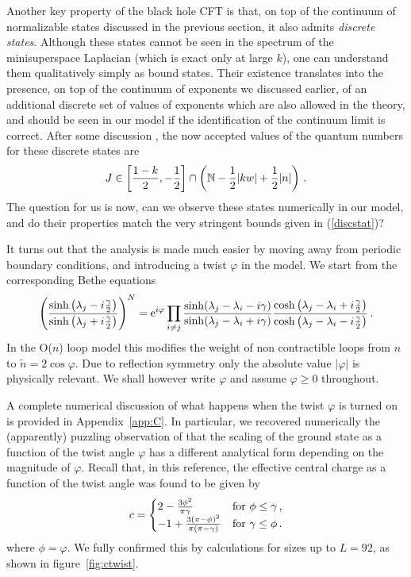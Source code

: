 \documentclass[11pt]{article}
\begin{document}
Another key property of the black hole CFT is that, on top of the continuum of normalizable states discussed in the previous section, it also admits {\sl discrete states}. Although these states cannot be seen in the spectrum of the minisuperspace Laplacian (which is exact only at large $k$), one can understand them qualitatively simply as bound states. Their existence translates into the presence, on top of the continuum of exponents we discussed earlier, of an additional  discrete set of values of exponents which are also allowed in the theory, and should be seen in our model if the identification of the continuum limit is correct. After some discussion \cite{BlackHoleCFT}, the now accepted values of the quantum numbers for these discrete states are \cite{RibSch,Troost}
%
\begin{equation}
J\in \left[{1-k\over 2},-{1\over 2}\right]\cap \left( \mathbb{N}-{1\over 2}|kw|+{1\over 2}|n| \right) \label{discstat} \,.
\end{equation}
%
The question for us is now, can we observe these states numerically in our model, and do their properties match the very stringent bounds given in (\ref{discstat})?

It turns out that the analysis is made much easier by moving away from periodic boundary conditions, and introducing a twist
$\varphi$ in the model.  We start from the corresponding  Bethe equations 
%
\begin{equation}
\left( {\sinh\left(\lambda_j-i{\gamma\over 2}\right)\over  
\sinh\left(\lambda_j+i{\gamma\over 2}\right)} \right)^N=
{\rm e}^{i \varphi}
\prod_{i\neq j} {\sinh(\lambda_j-\lambda_i-i\gamma)\over  \sinh
(\lambda_j-\lambda_i+i\gamma)}{\cosh\left(\lambda_j-\lambda_i+i{\gamma\over 2}\right)\over  
\cosh\left(\lambda_j-\lambda_i-i{\gamma\over 2}\right)} \,. \label{basiceqstwisted}
\end{equation}
%
In the O($n$) loop model this modifies the weight of non contractible loops from $n$ to $\tilde{n} = 2 \cos \varphi$.
Due to reflection symmetry only the absolute value $|\varphi|$ is physically relevant. We shall however write $\varphi$ and assume $\varphi \ge 0$ throughout.

A complete numerical discussion of what happens when the twist $\varphi$ is turned on is provided in Appendix~\ref{app:C}.
In particular, we recovered numerically the (apparently) puzzling observation of \cite{Nienhuis}  that the scaling of the  ground state as a function of the twist angle $\varphi$ has a different analytical form depending on the magnitude of $\varphi$. Recall that, in this reference,  the effective central charge as a function of the twist angle was found to be given by %
\begin{equation}
c = \begin{cases}  2 - {3 \phi^2 \over \pi \gamma } & \mbox{for } \phi\leq\gamma \,,
\\   -1 + {3(\pi - \phi)^2 \over \pi (\pi - \gamma)} & \mbox{for } \gamma \leq \phi \,.
\end{cases}
\label{eq:ctwist}
\end{equation}
%
where $\phi=\varphi$. We fully  confirmed this by calculations  for sizes up to $L=92$, as shown in figure~\ref{fig:ctwist}.
\end{document}
